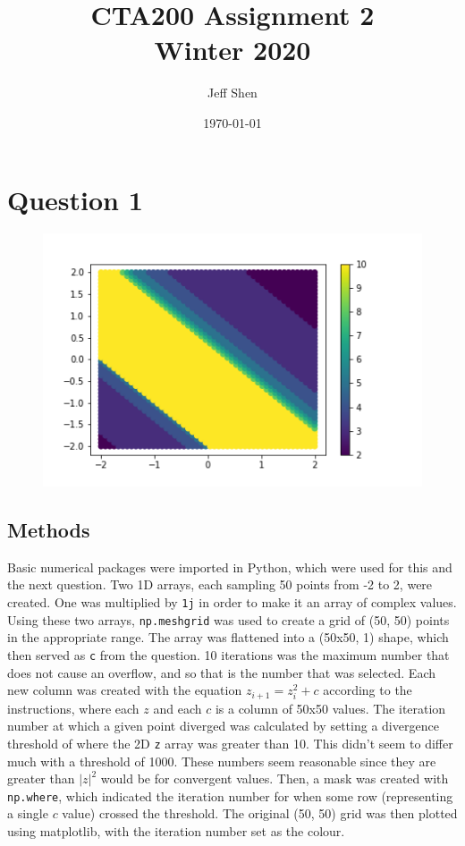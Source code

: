 \documentclass{article}
\newcommand{\code}[1]{\texttt{#1}}
\begin{document}
\title{%
	CTA200 Assignment 2 \\
	\large Winter 2020}
\author{Jeff Shen}
\date{\today}

\maketitle

\section*{Question 1}

\begin{figure}[!htbp]
	\centering
	\includegraphics[width=0.8\linewidth]{q1.png}
\end{figure}

\subsection*{Methods}

Basic numerical packages were imported in Python, which were used for this and the next question. Two 1D arrays, each sampling 50 points from -2 to 2, were created. One was multiplied by \code{1j} in order to make it an array of complex values. Using these two arrays, \code{np.meshgrid} was used to create a grid of (50, 50) points in the appropriate range. The array was flattened into a (50x50, 1) shape, which then served as \code{c} from the question. 10 iterations was the maximum number that does not cause an overflow, and so that is the number that was selected. Each new column was created with the equation $z_{i+1} = z_i^2 + c$ according to the instructions, where each $z$ and each $c$ is a column of 50x50 values. The iteration number at which a given point diverged was calculated by setting a divergence threshold of where the 2D \code{z} array was greater than 10. This didn't seem to differ much with a threshold of 1000. These numbers seem reasonable since they are greater than $|z|^2$ would be for convergent values. Then, a mask was created with \code{np.where}, which indicated the iteration number for when some row (representing a single $c$ value) crossed the threshold. The original (50, 50) grid was then plotted using matplotlib, with the iteration number set as the colour. 
\end{document}
